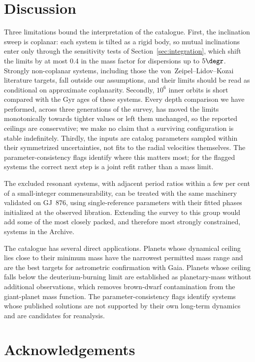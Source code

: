 \documentclass[fleqn,usenatbib]{mnras}
\begin{document}
\section{Discussion} \label{sec:discussion}

Three limitations bound the interpretation of the catalogue. First, the
inclination sweep is coplanar: each system is tilted as a rigid body, so
mutual inclinations enter only through the sensitivity tests of
Section~\ref{sec:integration}, which shift the limits by at most 0.4 in
the mass factor for dispersions up to $5\degr$. Strongly non-coplanar
systems, including those the von~Zeipel--Lidov--Kozai literature targets,
fall outside our assumptions, and their limits should be read as
conditional on approximate coplanarity. Secondly, $10^6$ inner orbits is
short compared with the Gyr ages of these systems. Every depth comparison
we have performed, across three generations of the survey, has moved the
limits monotonically towards tighter values or left them unchanged, so the
reported ceilings are conservative; we make no claim that a surviving
configuration is stable indefinitely. Thirdly, the inputs are catalog
parameters sampled within their symmetrized uncertainties, not fits to the
radial velocities themselves. The parameter-consistency flags identify
where this matters most; for the flagged systems the correct next step is
a joint refit rather than a mass limit.

The excluded resonant systems, with adjacent period ratios within a few
per cent of a small-integer commensurability, can be treated with the same
machinery validated on GJ~876, using single-reference parameters with
their fitted phases initialized at the observed libration. Extending the
survey to this group would add some of the most closely packed, and
therefore most strongly constrained, systems in the Archive.

The catalogue has several direct applications. Planets whose dynamical
ceiling lies close to their minimum mass have the narrowest permitted mass
range and are the best targets for astrometric confirmation with Gaia.
Planets whose ceiling falls below the deuterium-burning limit are
established as planetary-mass without additional observations, which
removes brown-dwarf contamination from the giant-planet mass function. The
parameter-consistency flags identify systems whose published solutions are
not supported by their own long-term dynamics and are candidates for
reanalysis.

\section*{Acknowledgements}
\end{document}
